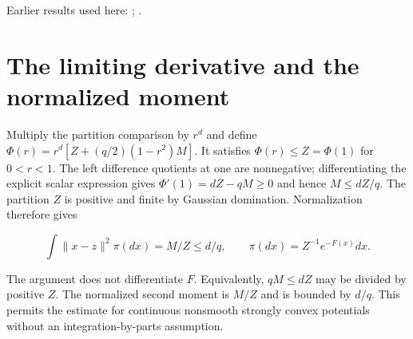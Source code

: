 \documentclass[11pt,a4paper]{article}
\begin{document}
Earlier results used here: \cite[Section~3.49.2]{LangevinLean2026ULASC}; \cite[Section~3.49.3]{LangevinLean2026ULASC}.

\section{\texorpdfstring{The limiting derivative and the normalized moment}{The limiting derivative and the normalized moment}}


Multiply the partition comparison by \(r^d\) and define \(\Phi(r)=r^d[Z+(q/2)(1-r^2)M]\). It satisfies \(\Phi(r)\le Z=\Phi(1)\) for \(0<r<1\). The left difference quotients at one are nonnegative; differentiating the explicit scalar expression gives \(\Phi'(1)=dZ-qM\ge0\) and hence \(M\le dZ/q\). The partition \(Z\) is positive and finite by Gaussian domination. Normalization therefore gives

\[\int\|x-z\|^2\pi(dx)=M/Z\le d/q,\qquad\pi(dx)=Z^{-1}e^{-F(x)}dx.\]

The argument does not differentiate \(F\). Equivalently, \(qM\le dZ\) may be divided by positive \(Z\). The normalized second moment is \(M/Z\) and is bounded by \(d/q\). This permits the estimate for continuous nonsmooth strongly convex potentials without an integration-by-parts assumption.
\end{document}
